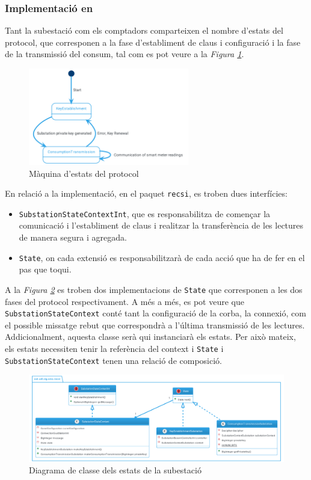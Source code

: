 \subsubsection{Implementació en \cite{recsi}}
Tant la subestació com els comptadors comparteixen el nombre d'estats del protocol, que corresponen a la fase d'establiment de claus i configuració i la fase de la transmissió del consum, tal com es pot veure a la \textit{Figura \ref{fig:recsi-state}}.
\begin{figure}[H]
	\centering
	\includegraphics[width=7cm]{classes/recsistate.png}
	\caption{Màquina d'estats del protocol \cite{recsi}}
	\label{fig:recsi-state}
\end{figure}
En relació a la implementació, en el paquet \texttt{recsi}, es troben dues interfícies:
\begin{itemize}
	\item \texttt{SubstationStateContextInt}, que es responsabilitza de començar la comunicació i l'establiment de claus i realitzar la transferència de les lectures de manera segura i agregada.
	\item \texttt{State}, on cada extensió es responsabilitzarà de cada acció que ha de fer en el pas que toqui.
\end{itemize}
A la \textit{Figura \ref{fig:recsi}} es troben dos implementacions de \texttt{State} que corresponen a les dos fases del protocol respectivament. A més a més, es pot veure que \texttt{SubstationStateContext} conté tant la configuració de la corba, la connexió, com el possible missatge rebut que correspondrà a l'última transmissió de les lectures. Addicionalment, aquesta classe serà qui instanciarà els estats. Per això mateix, els estats necessiten tenir la referència del context i \texttt{State} i \texttt{SubstationStateContext} tenen una relació de composició. 
\begin{figure}[H]
	\centering
	\includegraphics[width=16cm]{classes/recsi.png}
	\caption{Diagrama de classe dels estats de la subestació}
	\label{fig:recsi}
\end{figure}
